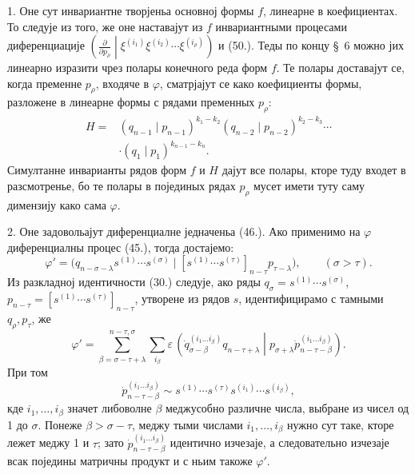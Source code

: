 ﻿\documentclass[11pt]{article}
\newcommand{\pair}[2]{\left(#1\middle|#2\right)}
\newcommand{\eps}{\varepsilon}
\begin{document}
1. Оне сут инвариантне творјеньа основној формы $f$, линеарне в коефициентах. То следује из того, же оне наставајут из $f$ инвариантными процесами диференциације
$\left(\frac{\partial}{\partial p_\rho}\middle|\xi^{(i_1)}\xi^{(i_2)}\cdots\xi^{(i_\rho)}\right)$ и (50.). Теды по концу \S\ 6 можно јих линеарно изразити чрез полары конечного реда форм $f$. Те полары доставајут се, когда пременне $p_\rho$, входяче в $\varphi$, сматрјајут се како коефициенты формы, разложене в линеарне формы с рядами пременных $p_\rho$:
\begin{equation}
\begin{aligned}
 H={}&(q_{n-1}\mid p_{n-1})^{k_1-k_2}
(q_{n-2}\mid p_{n-2})^{k_2-k_3}\cdots\\
&\cdot(q_1\mid p_1)^{k_{n-1}-k_n}.
\end{aligned}
\tag{52}
\end{equation}
Симултанне инварианты рядов форм $f$ и $H$ дајут все полары, кторе туду входет в разсмотренье, бо те полары в појединых рядах $p_\rho$ мусет имети туту саму димензију како сама $\varphi$.

2. Оне задовольајут диференциалне једначеньа (46.). Ако применимо на $\varphi$ диференциалны процес (45.), тогда достајемо:
\[
 \varphi'=\bigl(q_{n-\sigma-\lambda}s^{(1)}\cdots s^{(\sigma)}\mid [s^{(1)}\cdots s^{(\tau)}]_{n-\tau}p_{\tau-\lambda}\bigr),\qquad (\sigma>\tau).
\]
Из разкладној идентичности (30.) следује, ако ряды $q_\sigma=s^{(1)}\cdots s^{(\sigma)}$, $p_{n-\tau}=[s^{(1)}\cdots s^{(\tau)}]_{n-\tau}$, утворене из рядов $s$, идентифицирамо с тамными $q_\rho,p_\tau$, же
\[
 \varphi'=\sum_{\beta=\sigma-\tau+\lambda}^{n-\tau,\sigma}\sum_{i_\beta}\eps\,
 \pair{\dot{q}_{\sigma-\beta}^{(i_1\ldots i_\beta)}q_{n-\tau+\lambda}}{p_{\sigma+\lambda}\dot{p}_{n-\tau-\beta}^{(i_1\ldots i_\beta)}}.
\]
При том
\[
 \dot{p}_{n-\tau-\beta}^{(i_1\ldots i_\beta)}\sim s^{(1)}\cdots s^{(\tau)}s^{(i_1)}\cdots s^{(i_\beta)},
\]
кде $i_1,\ldots,i_\beta$ значет либоволне $\beta$ меджусобно различне числа, выбране из чисел од 1 до $\sigma$. Понеже $\beta>\sigma-\tau$, меджу тыми числами $i_1,\ldots,i_\beta$ нужно сут таке, кторе лежет меджу 1 и $\tau$; зато $\dot{p}_{n-\tau-\beta}^{(i_1\ldots i_\beta)}$ идентично изчезаје, а следовательно изчезаје всак поједины матричны продукт и с ньим такоже $\varphi'$.
\end{document}
